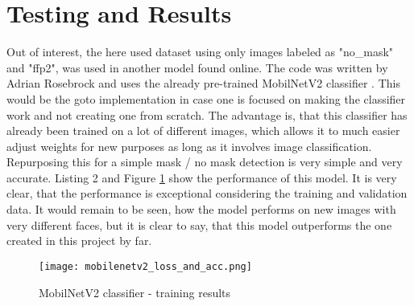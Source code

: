 \section{Testing and Results}




Out of interest, the here used dataset using only images labeled as "no\_mask"
and "ffp2", was used in another model found online. The code was written by
Adrian Rosebrock and uses the already pre-trained MobilNetV2 classifier
\cite{Rosebrock2020}. This would be the goto implementation in case one is focused
on making the classifier work and not creating one from scratch. The advantage
is, that this classifier has already been trained on a lot of different images,
which allows it to much easier adjust weights for new purposes as long as it
involves image classification. Repurposing this for a simple mask / no mask
detection is very simple and very accurate. Listing 2 and Figure
\ref{fig:mobilenetv2} show the performance of this model. It is very clear, that
the performance is exceptional considering the training and validation data. It
would remain to be seen, how the model performs on new images with very
different faces, but it is clear to say, that this model outperforms the one
created in this project by far.



\begin{figure}
    \centering
    \texttt{[image: mobilenetv2\_loss\_and\_acc.png]}
    \caption{MobilNetV2 classifier - training results}
    \label{fig:mobilenetv2}
\end{figure}
